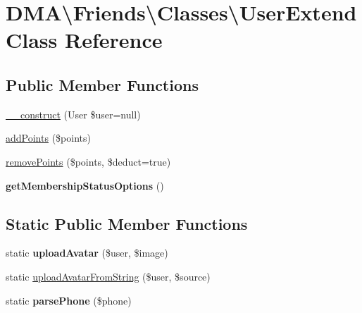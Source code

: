 \hypertarget{classDMA_1_1Friends_1_1Classes_1_1UserExtend}{}\section{D\+M\+A\textbackslash{}Friends\textbackslash{}Classes\textbackslash{}User\+Extend Class Reference}
\label{classDMA_1_1Friends_1_1Classes_1_1UserExtend}
\subsection*{Public Member Functions}
\begin{DoxyCompactItemize}
\item 
\hyperlink{classDMA_1_1Friends_1_1Classes_1_1UserExtend_aa399d503ccb972cb46171bd7cc2fbadf}{\+\_\+\+\_\+construct} (User \$user=null)
\item 
\hyperlink{classDMA_1_1Friends_1_1Classes_1_1UserExtend_ae2d0cddf99425d8ffbe2ed2c74372024}{add\+Points} (\$points)
\item 
\hyperlink{classDMA_1_1Friends_1_1Classes_1_1UserExtend_a72299c6e170b749617a262f18a8d7d67}{remove\+Points} (\$points, \$deduct=true)
\item 
\hypertarget{classDMA_1_1Friends_1_1Classes_1_1UserExtend_ac1de8e9326eaa1466503bf34fa0a3748}{}{\bfseries get\+Membership\+Status\+Options} ()\label{classDMA_1_1Friends_1_1Classes_1_1UserExtend_ac1de8e9326eaa1466503bf34fa0a3748}

\end{DoxyCompactItemize}
\subsection*{Static Public Member Functions}
\begin{DoxyCompactItemize}
\item 
\hypertarget{classDMA_1_1Friends_1_1Classes_1_1UserExtend_a0052edba29ca35647646bd33a05d9ccf}{}static {\bfseries upload\+Avatar} (\$user, \$image)\label{classDMA_1_1Friends_1_1Classes_1_1UserExtend_a0052edba29ca35647646bd33a05d9ccf}

\item 
static \hyperlink{classDMA_1_1Friends_1_1Classes_1_1UserExtend_afdb44d04557d6679074fa0399f0ce843}{upload\+Avatar\+From\+String} (\$user, \$source)
\item 
\hypertarget{classDMA_1_1Friends_1_1Classes_1_1UserExtend_aee1fe63ac574c2a6acabebcc00f2b4db}{}static {\bfseries parse\+Phone} (\$phone)\label{classDMA_1_1Friends_1_1Classes_1_1UserExtend_aee1fe63ac574c2a6acabebcc00f2b4db}

\end{DoxyCompactItemize}
